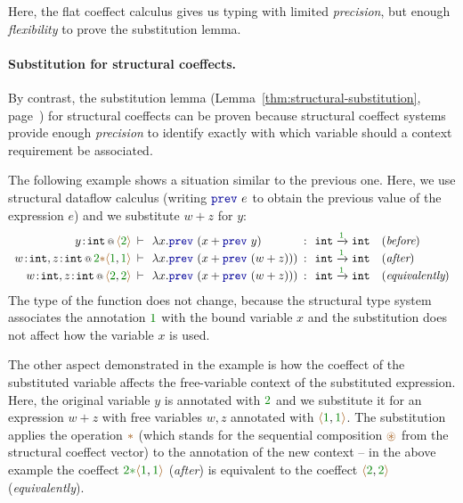 Here, the flat coeffect calculus gives us typing with limited \emph{precision}, but
enough \emph{flexibility} to prove the substitution lemma.

\paragraph{Substitution for structural coeffects.}
By contrast, the substitution lemma (Lemma~\ref{thm:structural-substitution},
page~\pageref{thm:structural-substitution}) for structural coeffects can be proven because
structural coeffect systems provide enough \emph{precision} to identify exactly with which
variable should a context requirement be associated.

The following example shows a situation similar to the previous one. Here, we use
structural dataflow calculus (writing $\kvd{prev}~e$ to obtain the previous value of the
expression $e$) and we substitute $w+z$ for $y$:
%
\begin{equation*}
\begin{array}{rclcll}
 \coctx{y\!:\!\ident{int}}{ \alift{\cclrd{2}} }
  &\narrow{\vdash}& \lambda x.\kvd{prev}~(x + \kvd{prev}~y) &\narrow{:}&
   \ident{int} \xrightarrow{\cclrd{ 1 }} \ident{int} & (\textit{before}) \\
\coctx{w\!:\!\ident{int}, z\!:\!\ident{int}}{\cclrd{2}\aclrd{\ast}\alift{\cclrd{1},\cclrd{1}}}
  &\narrow{\vdash}& \lambda x.\kvd{prev}~(x + \kvd{prev}~(w+z))) &\narrow{:}&
   \ident{int} \xrightarrow{\cclrd{ 1 }} \ident{int} & (\textit{after}) \\
\coctx{w\!:\!\ident{int}, z\!:\!\ident{int}}{\alift{\cclrd{2},\cclrd{2}}}
  &\narrow{\vdash}& \lambda x.\kvd{prev}~(x + \kvd{prev}~(w+z))) &\narrow{:}&
   \ident{int} \xrightarrow{\cclrd{ 1 }} \ident{int} & (\textit{equivalently})
\end{array}
\end{equation*}
%
The type of the function does not change, because the structural type system associates
the annotation $\cclrd{1}$ with the bound variable $x$ and the substitution does not
affect how the variable $x$ is used.

The other aspect demonstrated in the example is how the coeffect of the substituted
variable affects the free-variable context of the substituted expression. Here, the
original variable $y$ is annotated with $\cclrd{2}$ and we substitute it for an
expression $w+z$ with free variables $w,z$ annotated with $\alift{\cclrd{1}, \cclrd{1}}$.
The substitution applies the operation $\aclrd{\ast}$ (which stands for the sequential
composition $\aseq$ from the structural coeffect vector) to the annotation of the new context --
in the above example the coeffect $\cclrd{2}\cclrd{\ast}\alift{\cclrd{1}, \cclrd{1}}$ (\emph{after}) is
equivalent to the coeffect $\alift{\cclrd{2}, \cclrd{2}}$ (\emph{equivalently}).

